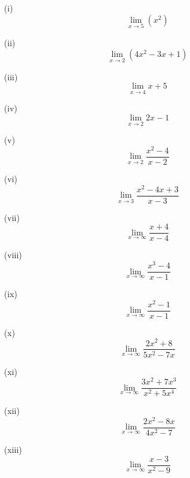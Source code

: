 \documentclass[a4paper,12pt]{article}
\begin{document}
\begin{multicols}{2}
	\begin{itemize}
		\item[(i)] \[ \lim_{x\to 5} (x^2)\]
		
		\item[(ii)] \[ \lim_{x\to 2} (4x^2 - 3x+1)\]
		
		
		\item[(iii)]\[\lim_{x \to 4 } x  + 5 \]
		\item[(iv)]\[\lim_{x \to 2 } 2x  - 1 \]
		\item[(v)]\[\lim_{x \to 2 } \frac{x^2-4}{x-2}\]
		\item[(vi)]\[\lim_{x \to 3 } \frac{x^2-4x +3}{x-3}\]
		
		\item[(vii)]\[\lim_{x \to \infty } \frac{x+4}{x-4}\]
		\item[(viii)]\[\lim_{x \to \infty } \frac{x^3-4}{x-1}\]
		\item[(ix)] \[\lim_{x \to \infty } \frac{x^2-1}{x-1} \]
		
		\item[(x)] \[ \lim_{x \to \infty} \frac{2x^2 +8}{5x^2 - 7x} \] 
		
		\item[(xi)]\[ \lim_{x \to \infty} \frac{3x^2 +7x^3}{x^2 +5x^4} \] 
		
		\item[(xii)] \[ \lim_{x \to \infty} \frac{2x^2 - 8x }{4x^2 - 7} \]
		
		
		\item[(xiii)] \[ \lim_{x \to \infty} \frac{x-3}{x^2 - 9} \]
	\end{itemize}
\end{multicols}

\end{document}
